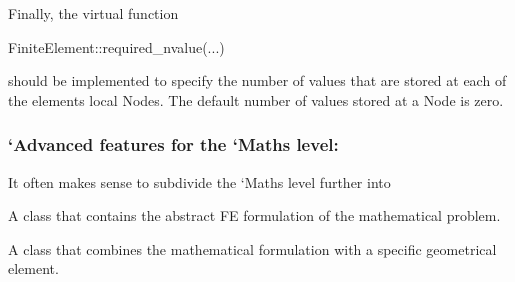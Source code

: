 Finally, the virtual function 
\begin{DoxyCode}
FiniteElement::required\_nvalue(...)  
\end{DoxyCode}
 should be implemented to specify the number of values that are stored at each of the element\textquotesingle{}s local {\ttfamily Nodes}. The default number of values stored at a {\ttfamily Node} is zero.\hypertarget{index_advanced_features_of_elements}{}\subsubsection{`\+Advanced\textquotesingle{} features for the `\+Maths\textquotesingle{} level\+:}\label{index_advanced_features_of_elements}
It often makes sense to subdivide the `\+Maths\textquotesingle{} level further into
\begin{DoxyEnumerate}
\item A class that contains the abstract FE formulation of the mathematical problem.
\item A class that combines the mathematical formulation with a specific geometrical element.
\end{DoxyEnumerate}

